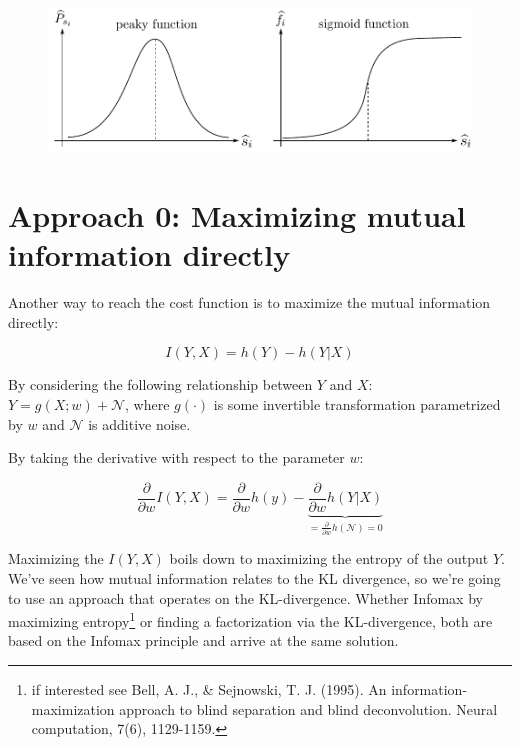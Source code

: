 \begin{figure}[h]
  \centering
  \includegraphics[width=12cm]{img/section2_fig15}  
  \label{fig:cdf}
\end{figure}

\newpage

\section{Approach 0: Maximizing mutual information directly}

Another way to reach the cost function is to maximize the mutual information directly:

$$
I(Y,X) = h(Y) - h(Y|X)
$$

By considering the following relationship between $Y$ and $X$:\\
$Y = g(X;w) + \mathcal{N}$, where $g(\cdot)$ is some invertible transformation parametrized by $w$ and $\mathcal{N}$ is additive noise.

By taking the derivative with respect to the parameter $w$:

$$
\frac{\partial}{\partial w} I(Y,X) = \frac{\partial}{\partial w}h(y) - 
\underbrace{\frac{\partial}{\partial w} h(Y|X)}_{= \frac{\partial}{\partial w} h(\mathcal{N}) = 0}
$$

Maximizing the $I(Y,X)$ boils down to maximizing the entropy of the output $Y$. 
We've seen how mutual information relates to the KL divergence, so we're going to use an approach 
that operates on the KL-divergence. 
Whether Infomax by maximizing entropy\footnote{if interested see Bell, A. J., \& Sejnowski, T. J. (1995). An information-maximization approach to blind separation and blind deconvolution. Neural computation, 7(6), 1129-1159.} 
or finding a factorization via the KL-divergence,
both are based on the Infomax principle and arrive at the same solution.

\clearpage

